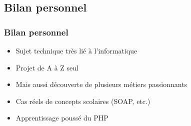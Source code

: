 \subsection{Bilan personnel}

\begin{frame}
	\frametitle{Bilan personnel}
	
	\begin{itemize}
		\item Sujet technique très lié à l'informatique
		\item Projet de A à Z seul
		\item Mais aussi découverte de plusieurs métiers passionnants\sautligne
		
		\item Cas réels de concepts scolaires (SOAP, etc.)\sautligne
		
		\item Apprentissage poussé du PHP
	\end{itemize}
\end{frame}
